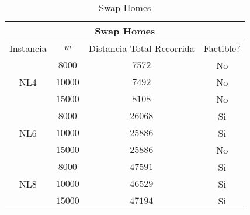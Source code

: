 \documentclass[letter, 10pt]{article}
\begin{document}
\begin{table}[h]
\centering
\label{my-label}
\begin{tabular}{cccc}
\multicolumn{4}{c}{\textbf{Swap Homes}}                                                                                                                      \\ \hline
\multicolumn{1}{|c|}{Instancia}            & \multicolumn{1}{c|}{$w$}     & \multicolumn{1}{c|}{Distancia Total  Recorrida} & \multicolumn{1}{c|}{Factible?} \\ \hline
\multicolumn{1}{|c|}{\multirow{3}{*}{NL4}} & \multicolumn{1}{c|}{$8000$}  & \multicolumn{1}{c|}{$7572$}                     & \multicolumn{1}{c|}{No}        \\ \cline{2-4} 
\multicolumn{1}{|c|}{}                     & \multicolumn{1}{c|}{$10000$} & \multicolumn{1}{c|}{$7492$}                     & \multicolumn{1}{c|}{No}        \\ \cline{2-4} 
\multicolumn{1}{|c|}{}                     & \multicolumn{1}{c|}{$15000$} & \multicolumn{1}{c|}{$8108$}                     & \multicolumn{1}{c|}{No}        \\ \hline
\multicolumn{1}{|c|}{\multirow{3}{*}{NL6}} & \multicolumn{1}{c|}{$8000$}  & \multicolumn{1}{c|}{$26068$}                    & \multicolumn{1}{c|}{Si}        \\ \cline{2-4} 
\multicolumn{1}{|c|}{}                     & \multicolumn{1}{c|}{$10000$} & \multicolumn{1}{c|}{$25886$}                    & \multicolumn{1}{c|}{Si}        \\ \cline{2-4} 
\multicolumn{1}{|c|}{}                     & \multicolumn{1}{c|}{$15000$} & \multicolumn{1}{c|}{$25886$}                    & \multicolumn{1}{c|}{No}        \\ \hline
\multicolumn{1}{|c|}{\multirow{3}{*}{NL8}} & \multicolumn{1}{c|}{$8000$}  & \multicolumn{1}{c|}{$47591$}                    & \multicolumn{1}{c|}{Si}        \\ \cline{2-4} 
\multicolumn{1}{|c|}{}                     & \multicolumn{1}{c|}{$10000$} & \multicolumn{1}{c|}{$46529$}                    & \multicolumn{1}{c|}{Si}        \\ \cline{2-4} 
\multicolumn{1}{|c|}{}                     & \multicolumn{1}{c|}{$15000$} & \multicolumn{1}{c|}{$47194$}                    & \multicolumn{1}{c|}{Si}        \\ \hline
\end{tabular}
\caption{Swap Homes}
\end{table}
    
\end{document}
